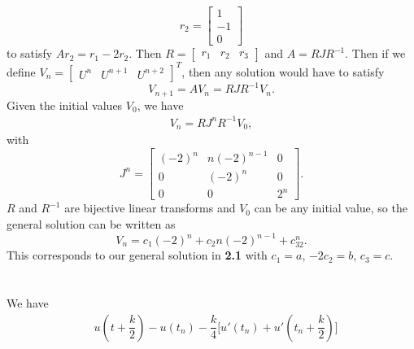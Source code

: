 \documentclass[11pt]{article}
\begin{document}
\begin{equation}
    r_2 = \begin{bmatrix}
        1 \\ -1 \\ 0
    \end{bmatrix}
\nonumber\end{equation}
to satisfy $Ar_2=r_1-2r_2$. Then $R=\begin{bmatrix}
    r_1 & r_2 & r_3
\end{bmatrix}$
and $A=RJR^{-1}$. Then if we define $V_n=\begin{bmatrix}
    U^n & U^{n+1} & U^{n+2}
\end{bmatrix}^T$, then any solution would have to satisfy
\begin{equation}
    V_{n+1} = AV_n = RJR^{-1}V_n.
\end{equation}
Given the initial values $V_0$, we have
\begin{equation}\begin{split}
    V_n = RJ^nR^{-1}V_0,
\end{split}\end{equation}
with
\begin{equation}
    J^n = \begin{bmatrix}
        (-2)^n & n(-2)^{n-1} & 0\\
        0 & (-2)^n & 0\\
        0 & 0 & 2^n
    \end{bmatrix}.
\end{equation}
$R$ and $R^{-1}$ are bijective linear transforms and $V_0$ can be any initial value, 
so the general solution can be written as
\begin{equation}
    V_n = c_1(-2)^n + c_2n(-2)^{n-1} + c_32^n.
\end{equation}
This corresponds to our general solution in \textbf{2.1} with $c_1=a$, $-2c_2=b$, $c_3=c$.

\pagebreak
\section{}
\subsection{}
We have
\begin{equation}\begin{split}
    &u(t+\dfrac k2)-u(t_n)-\dfrac k4\big[u'(t_n)+u'(t_n+\dfrac k2)\big]\\

\end{split}\nonumber\end{equation} 
\end{document}

